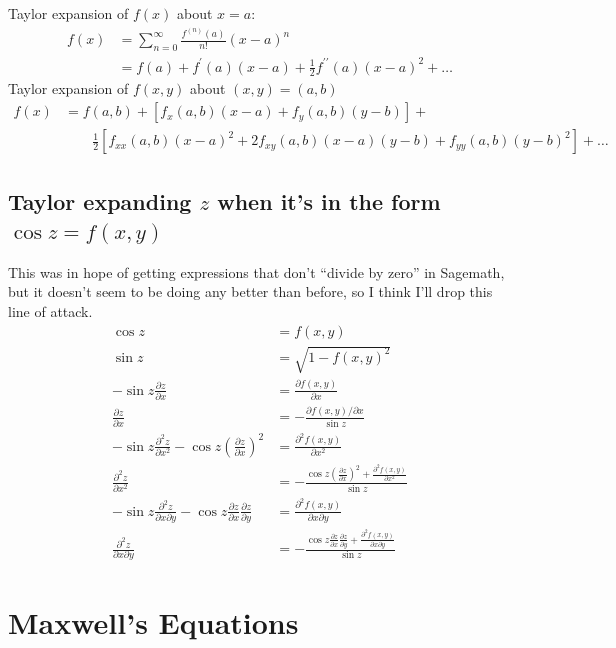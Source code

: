 \documentclass{book}
\newcommand{\pd}[2]{\frac{\partial {#1}}{\partial {#2}}}
\newcommand{\ppd}[2]{\frac{\partial^2{#1}}{\partial {#2}^2}}
\newcommand{\pdpd}[3]{\frac{\partial^2{#1}}{\partial {#2} \partial {#3}}}
\begin{document}
Taylor expansion of $f(x)$ about $x = a$:
\begin{equation}
    \begin{aligned}
        f(x) &= \sum_{n=0}^\infty \frac{f^{(n)}(a)}{n!}(x-a)^n \\
             &= f(a) + f^\prime(a)(x-a) + \frac12 f^{\prime\prime}(a)(x-a)^2 + \dots
    \end{aligned}
\end{equation}
Taylor expansion of $f(x,y)$ about $(x,y) = (a,b)$
\begin{equation}
    \begin{aligned}
        f(x) &= f(a,b) + [f_x(a,b)(x-a) + f_y(a,b)(y-b)] + \\
             &\qquad \frac12 [f_{xx}(a,b)(x-a)^2 + 2f_{xy}(a,b)(x-a)(y-b) + f_{yy}(a,b)(y-b)^2] + \dots
    \end{aligned}
\end{equation}

\subsection{Taylor expanding $z$ when it's in the form $\cos z = f(x,y)$}

This was in hope of getting expressions that don't ``divide by zero'' in Sagemath, but it doesn't seem to be doing any better than before, so I think I'll drop this line of attack.
\begin{equation}
    \begin{aligned}
        \cos z &= f(x,y) \\
        \sin z &= \sqrt{1-f(x,y)^2} \\
        -\sin z \pd{z}{x} &= \pd{f(x,y)}{x} \\
        \pd{z}{x} &= -\frac{\partial f(x,y)/\partial{x}}{\sin z} \\
        -\sin z \ppd{z}{x} - \cos z \left(\pd{z}{x}\right)^2 &= \ppd{f(x,y)}{x} \\
        \ppd{z}{x} &= -\frac{\cos z \left(\pd{z}{x}\right)^2 + \ppd{f(x,y)}{x}}{\sin z} \\
        -\sin z \pdpd{z}{x}{y} - \cos z \pd{z}{x}\pd{z}{y} &= \pdpd{f(x,y)}{x}{y} \\
        \pdpd{z}{x}{y} &= -\frac{\cos z \pd{z}{x}\pd{z}{y} + \pdpd{f(x,y)}{x}{y}}{\sin z}
    \end{aligned}
\end{equation}

\section{Maxwell's Equations}
\end{document}
